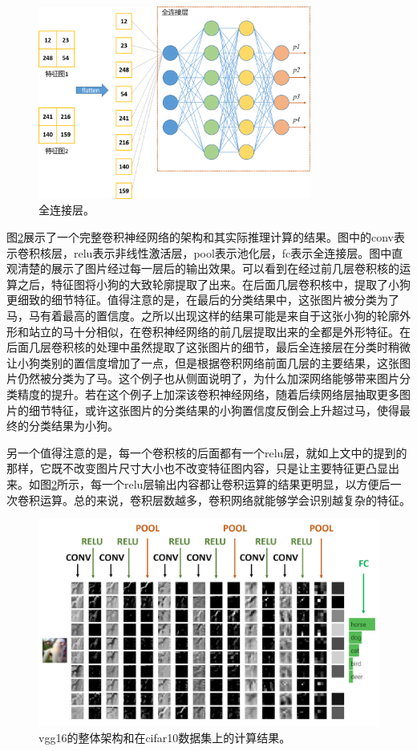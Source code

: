 \begin{figure}[ht]
	\centering
	\includegraphics[width=0.8\textwidth]{figures/fclayer.png}
	\caption{全连接层。}
	\label{fclayer}
\end{figure}

图\ref{framework}展示了一个完整卷积神经网络的架构和其实际推理计算的结果。图中的conv表示卷积核层，relu表示非线性激活层，pool表示池化层，fc表示全连接层。图中直观清楚的展示了图片经过每一层后的输出效果。可以看到在经过前几层卷积核的运算之后，特征图将小狗的大致轮廓提取了出来。在后面几层卷积核中，提取了小狗更细致的细节特征。值得注意的是，在最后的分类结果中，这张图片被分类为了马，马有着最高的置信度。之所以出现这样的结果可能是来自于这张小狗的轮廓外形和站立的马十分相似，在卷积神经网络的前几层提取出来的全都是外形特征。在后面几层卷积核的处理中虽然提取了这张图片的细节，最后全连接层在分类时稍微让小狗类别的置信度增加了一点，但是根据卷积网络前面几层的主要结果，这张图片仍然被分类为了马。这个例子也从侧面说明了，为什么加深网络能够带来图片分类精度的提升。若在这个例子上加深该卷积神经网络，随着后续网络层抽取更多图片的细节特征，或许这张图片的分类结果的小狗置信度反倒会上升超过马，使得最终的分类结果为小狗。

另一个值得注意的是，每一个卷积核的后面都有一个relu层，就如上文中的提到的那样，它既不改变图片尺寸大小也不改变特征图内容，只是让主要特征更凸显出来。如图\ref{framework}所示，每一个relu层输出内容都让卷积运算的结果更明显，以方便后一次卷积运算。总的来说，卷积层数越多，卷积网络就能够学会识别越复杂的特征。
\begin{figure}[ht]
	\centering
	\includegraphics[width=1\textwidth]{figures/vggResult.png}
	\caption{vgg16的整体架构和在cifar10数据集上的计算结果。}
	\label{framework}
\end{figure}

